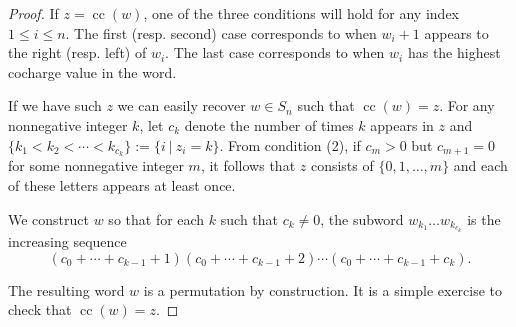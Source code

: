 \documentclass[10pt]{amsart}
\theoremstyle{plain}
\theoremstyle{definition}
\theoremstyle{plain}
\theoremstyle{plain}
\theoremstyle{remark}
\theoremstyle{plain}
\theoremstyle{plain}
\DeclareMathOperator{\cc}{cc}
\begin{document}
\begin{proof}
    If $z = \cc(w)$, one of the three conditions will hold for any index $1\leq i \leq n$.
    The first (resp. second) case corresponds to when $w_i + 1$ appears to the right (resp. left) of $w_i$. 
   The last case corresponds to when $w_i$ has the highest cocharge value in the word.
   
   If we have such $z$ we can easily recover $w\in S_n$ such that $\cc(w) = z$. 
    For any nonnegative integer $k$, let $c_k$ denote the number of times $k$ appears in $z$ and $\{k_1<k_2<\cdots<k_{c_k}\} := \{i \ | \ z_i = k\}$. From condition (2), if $c_m >0$ but $c_{m+1} = 0$ for some nonnegative integer $m$, it follows that $z$ consists of $\{0,1,\dots, m\}$ and each of these letters appears at least once.

    We construct $w$ so that for each $k$ such that $c_k\neq 0$, the subword $w_{k_1}\dots w_{k_{c_k}}$ is the increasing sequence \[(c_0+\cdots+ c_{k-1} + 1)(c_0+\cdots+ c_{k-1} + 2)\cdots (c_0+\cdots+ c_{k-1} + c_k).\] 
    
    The resulting word $w$ is a permutation by construction. It is a simple exercise to check that $\cc(w) = z$.
    \end{proof}
\end{document}
